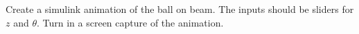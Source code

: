 Create a simulink animation of the ball on beam. The inputs should be sliders for $z$ and $\theta$.  Turn in a screen capture of the animation.
